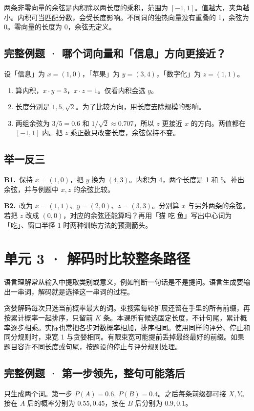 \documentclass[UTF8,a4paper,11pt]{ctexart}
\newcommand{\CompactQuestion}[2]{\par\noindent\textbf{#1.}\ #2\par\vspace{.8em}}
\begin{document}
两条非零向量的余弦是内积除以两长度的乘积，范围为 $[-1,1]$。值越大，夹角越小。内积可当匹配分数，会受长度影响。不同词的独热向量没有重叠的 1，余弦为 0。零向量的长度为 0，余弦无定义。

\subsection{完整例题 · 哪个词向量和「信息」方向更接近？}
设「信息」为 $x=(1,0)$，「苹果」为 $y=(3,4)$，「数字化」为 $z=(1,1)$。

\begin{enumerate}
\item 算内积，$x\cdot y=3$，$x\cdot z=1$。仅看内积会选 $y$。
\item 长度分别是 $1,5,\sqrt2$。为了比较方向，用长度去除规模的影响。
\item 两组余弦为 $3/5=0.6$ 和 $1/\sqrt2\approx0.707$，所以 $z$ 更接近 $x$ 的方向。两值都在 $[-1,1]$ 内。把 $z$ 乘正数只改变长度，余弦保持不变。
\end{enumerate}
\subsection{举一反三}
\CompactQuestion{B1}{保持 $x=(1,0)$，把 $y$ 换为 $(4,3)$。内积为 4，两个长度是 1 和 5。补出余弦，并与例题中 $x,z$ 的余弦比较。}
\CompactQuestion{B2}{改为 $x=(1,1)$、$y=(2,0)$、$z=(3,3)$。分别算 $x$ 与另外两条的余弦。若把 $z$ 改成 $(0,0)$，对应的余弦还能算吗？再用「猫 吃 鱼」写出中心词为「吃」、窗口半径 1 时两种训练方法的预测箭头。}
\clearpage
\section{单元 3 · 解码时比较整条路径}
语言理解常从输入中提取类别或意义，例如判断一句话是不是提问。语言生成要输出一串词，解码就是选择这一串词的过程。

贪婪解码每次只选当前概率最大的词。束搜索每轮扩展还留在手里的所有前缀，再按累计概率一起排序，只留前 $K$ 条。本课所有候选固定长度，不计句尾，累计概率逐步相乘。实际也常把各步对数概率相加，排序相同。使用同样的评分、停止和同分规则时，束宽 1 与贪婪相同。有限束宽可能提前丢掉最终最好的前缀。如果题目容许不同长度或句尾，按题设的停止与评分规则处理。

\subsection{完整例题 · 第一步领先，整句可能落后}
只生成两个词。第一步 $P(A)=0.6,\ P(B)=0.4$。之后每条前缀都可接 $X,Y$。接在 $A$ 后的概率分别为 $0.55,0.45$，接在 $B$ 后分别为 $0.9,0.1$。
\end{document}
